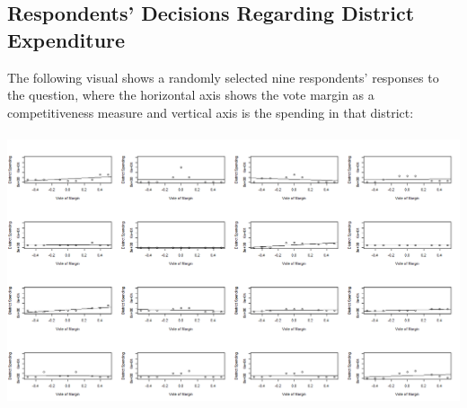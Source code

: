 \documentclass{article}
\begin{document}
\subsection{Respondents' Decisions Regarding District Expenditure}
The following visual shows a randomly selected nine respondents' responses to the question, where the horizontal axis shows the vote margin as a competitiveness measure and vertical axis is the spending in that district:\\
\\
\includegraphics[width=180mm]{Respondents_1}
\\

\end{document}
